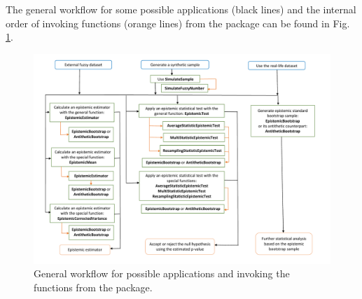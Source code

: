The general workflow for some possible applications (black lines) and the internal order of invoking functions (orange lines) from the  package can be found in Fig. \ref{figflowchart1}.
\begin{figure}[htb]
  \centering
	\includegraphics[scale=0.5]{flowchart3.pdf}
	\caption{General workflow for possible applications and invoking the functions from the  package.}
	\label{figflowchart1}
\end{figure}
